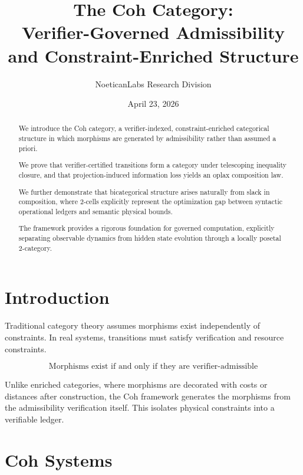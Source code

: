 \documentclass[11pt]{article}
\title{\textbf{The Coh Category:\\
Verifier-Governed Admissibility and Constraint-Enriched Structure}}
\author{NoeticanLabs Research Division}
\date{April 23, 2026}
\begin{document}
\maketitle

\begin{abstract}
We introduce the Coh category, a verifier-indexed, constraint-enriched categorical structure in which morphisms are generated by admissibility rather than assumed a priori. 

We prove that verifier-certified transitions form a category under telescoping inequality closure, and that projection-induced information loss yields an oplax composition law.

We further demonstrate that bicategorical structure arises naturally from slack in composition, where 2-cells explicitly represent the optimization gap between syntactic operational ledgers and semantic physical bounds. 

The framework provides a rigorous foundation for governed computation, explicitly separating observable dynamics from hidden state evolution through a locally posetal 2-category.
\end{abstract}

\section{Introduction}

Traditional category theory assumes morphisms exist independently of constraints. In real systems, transitions must satisfy verification and resource constraints. 

\[
\boxed{
\text{Morphisms exist if and only if they are verifier-admissible}
}
\]

Unlike enriched categories, where morphisms are decorated with costs or distances after construction, the Coh framework generates the morphisms from the admissibility verification itself. This isolates physical constraints into a verifiable ledger.

\section{Coh Systems}
\end{document}
